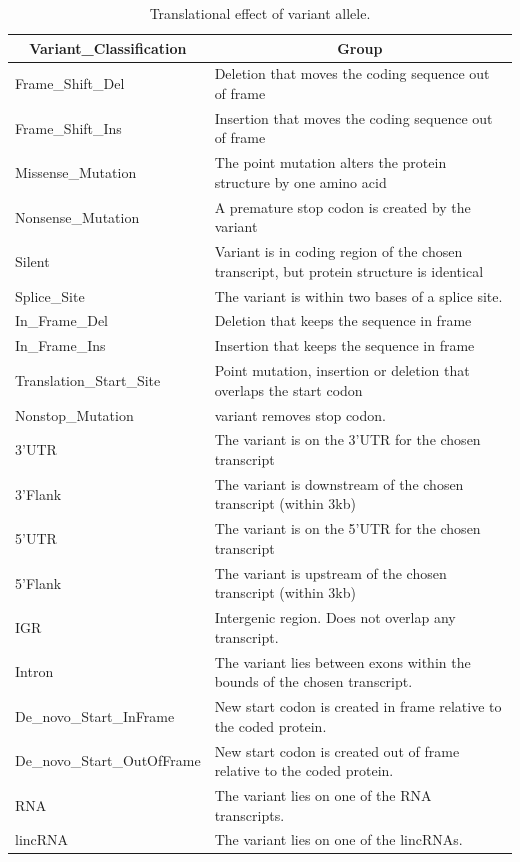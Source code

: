 \begin{landscape}

\begin{table}[]
\centering
\caption[Translational effect of variant allele]{Translational effect of variant allele. \cite{GTAK_maf}}
\label{mutation-effect}
\begin{tabular}{@{}ll@{}}
\toprule
\toprule
\multicolumn{1}{c}{\textbf{Variant\_Classification}} & \multicolumn{1}{c}{\textbf{Group}} \\ \midrule \midrule
Frame\_Shift\_Del & Deletion that moves the coding sequence out of frame \\
Frame\_Shift\_Ins & Insertion that moves the coding sequence out of frame \\
Missense\_Mutation &  The point mutation alters the protein structure by one amino acid \\
Nonsense\_Mutation & A premature stop codon is created by the variant \\
Silent & Variant is in coding region of the chosen transcript, but protein structure is identical \\
Splice\_Site & The variant is within two bases of a splice site.  \\
In\_Frame\_Del & Deletion that keeps the sequence in frame \\
In\_Frame\_Ins & Insertion that keeps the sequence in frame \\
Translation\_Start\_Site & Point mutation, insertion or deletion that overlaps the start codon \\
Nonstop\_Mutation & variant removes stop codon. \\
3'UTR & The variant is on the 3'UTR for the chosen transcript \\
3'Flank & The variant is downstream of the chosen transcript (within 3kb) \\
5'UTR & The variant is on the 5'UTR for the chosen transcript \\
5'Flank & The variant is upstream of the chosen transcript (within 3kb) \\
IGR & Intergenic region. Does not overlap any transcript. \\
Intron & The variant lies between exons within the bounds of the chosen transcript. \\
De\_novo\_Start\_InFrame & New start codon is created in frame relative to the coded protein. \\
De\_novo\_Start\_OutOfFrame & New start codon is created out of frame relative to the coded protein. \\
RNA & The variant lies on one of the RNA transcripts. \\
lincRNA & The variant lies on one of the lincRNAs. \\\bottomrule
\end{tabular}
\end{table}

\end{landscape}
